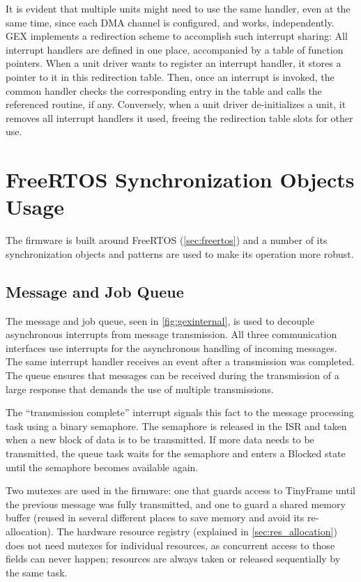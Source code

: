 It is evident that multiple units might need to use the same handler, even at the same time, since each \gls{DMA} channel is configured, and works, independently. GEX implements a redirection scheme to accomplish such interrupt sharing: All interrupt handlers are defined in one place, accompanied by a table of function pointers. When a unit driver wants to register an interrupt handler, it stores a pointer to it in this redirection table. Then, once an interrupt is invoked, the common handler checks the corresponding entry in the table and calls the referenced routine, if any. Conversely, when a unit driver de-initializes a unit, it removes all interrupt handlers it used, freeing the redirection table slots for other use.

\section{FreeRTOS Synchronization Objects Usage} \label{sec:rtos_in_gex}

The firmware is built around FreeRTOS (\cref{sec:freertos}) and a number of its synchronization objects and patterns are used to make its operation more robust.

\subsection{Message and Job Queue}

The message and job queue, seen in \cref{fig:gexinternal}, is used to decouple asynchronous interrupts from message transmission. All three communication interfaces use interrupts for the asynchronous handling of incoming messages. The same interrupt handler receives an event after a transmission was completed. The queue ensures that messages can be received during the transmission of a large response that demands the use of multiple transmissions.

The ``transmission complete'' interrupt signals this fact to the message processing task using a binary semaphore. The semaphore is released in the \gls{ISR} and taken when a new block of data is to be transmitted. If more data needs to be transmitted, the queue task waits for the semaphore and enters a Blocked state until the semaphore becomes available again.

Two mutexes are used in the firmware: one that guards access to TinyFrame until the previous message was fully transmitted, and one to guard a shared memory buffer (reused in several different places to save memory and avoid its re-allocation). The hardware resource registry (explained in \cref{sec:res_allocation}) does not need mutexes for individual resources, as concurrent access to those fields can never happen; resources are always taken or released sequentially by the same task.


